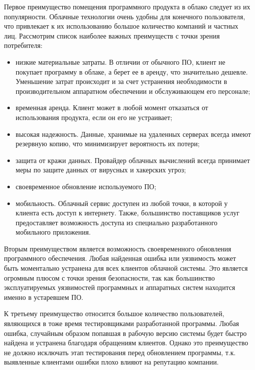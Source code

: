 Первое преимущество помещения программного продукта в облако следует из их популярности. Облачные технологии очень удобны для конечного пользователя, что привлекает к их использованию большое количество компаний и частных лиц. Рассмотрим список наиболее важных преимуществ с точки зрения потребителя:

\begin{itemize}
	\item низкие материальные затраты. В отличии от обычного ПО, клиент не покупает программу в облаке, а берет ее в аренду, что значительно дешевле. Уменьшение затрат происходит и за счет устранения необходимости в производительном аппаратном обеспечении и обслуживающем его персонале;

	\item временная аренда. Клиент может в любой момент отказаться от использования продукта, если он его не устраивает;

	\item высокая надежность. Данные, хранимые на удаленных серверах всегда имеют резервную копию, что минимизирует вероятность их потери;

	\item защита от кражи данных. Провайдер облачных вычислений всегда принимает меры по защите данных от вирусных и хакерских угроз;

	\item своевременное обновление используемого ПО;

	\item мобильность. Облачный сервис доступен из любой точки, в которой у клиента есть доступ к интернету.  Также, большинство поставщиков услуг предоставляет возможность доступа из специально разработанного мобильного приложения.
\end{itemize}

Вторым преимуществом является возможность своевременного обновления программного обеспечения. Любая найденная ошибка или уязвимость может быть моментально устранена для всех клиентов облачной системы. Это является огромным плюсом с точки зрения безопасности, так как большинство эксплуатируемых уязвимостей программных и аппаратных систем находится именно в устаревшем ПО.

К третьему преимущество относится большое количество пользователей, являющихся в тоже время тестировщиками разработанной программы. Любая ошибка, случайным образом попавшая в рабочую версию системы будет быстро найдена и устранена благодаря обращениям клиентов. Однако это преимущество не должно исключать этап тестирования перед обновлением программы, т.к. выявленные клиентами ошибки плохо влияют на репутацию компании.

